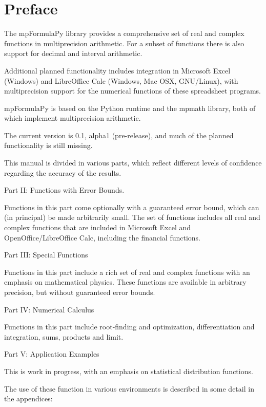 \chapter{Preface}
\label{Preface} 

The mpFormulaPy library provides a comprehensive set of real and complex functions in multiprecision arithmetic. For a subset of functions there is also support for decimal and interval arithmetic. 

\vpara
Additional planned functionality includes integration in Microsoft Excel (Windows) and LibreOffice Calc (Windows, Mac OSX, GNU/Linux), with multiprecision support for the numerical functions of these spreadsheet programs. 

\vpara
mpFormulaPy is based on the Python runtime and the mpmath library, both of which implement multiprecision arithmetic. 

\vpara
The current version is 0.1, alpha1 (pre-release), and much of the planned functionality is still missing.

\vpara

\vpara
This manual is divided in various parts, which reflect different levels of confidence regarding the accuracy of the results.

\vpara
Part II: Functions with Error Bounds.

Functions in this part come optionally with a guaranteed error bound, which can (in principal) be made arbitrarily small. The set of functions includes all real and complex functions that are included in Microsoft Excel and OpenOffice/LibreOffice Calc, including the financial functions. 


\vpara
Part III: Special Functions

Functions in this part include  a rich set of real and complex functions with an emphasis on mathematical physics. These functions are available in arbitrary precision, but without guaranteed error bounds.

\vpara
Part IV: Numerical Calculus

Functions in this part include root-finding and optimization, differentiation and integration, sums, products and limit.

\vpara
Part V: Application Examples

This is work in progress, with an emphasis on statistical distribution functions.


\vpara
The use of these function in various environments is described in some detail in the appendices:

